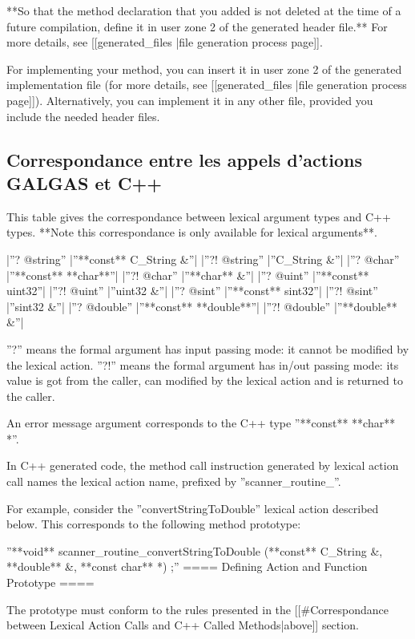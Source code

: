 {**So that the method declaration that you added is not deleted at the time of a future compilation, define it in user zone 2 of the generated header file.** For more details, see [[generated\_files |file generation process page]].

For implementing your method, you can insert it in user zone 2 of the generated implementation file (for more details, see [[generated\_files |file generation process page]]). Alternatively, you can implement it in any other file, provided you include the needed header files.

\subsection{Correspondance entre les appels d'actions GALGAS et C++}

This table gives the correspondance between lexical argument types and C++ types. **Note this correspondance is only available for lexical arguments**.

|''? @string''  |''**const** C\_String \&''|
|''?! @string''  |''C\_String \&''|
|''? @char''  |''**const** **char**''|
|''?! @char''  |''**char** \&''|
|''? @uint''  |''**const** uint32''|
|''?! @uint''  |''uint32 \&''|
|''? @sint''  |''**const** sint32''|
|''?! @sint''  |''sint32 \&''|
|''? @double''  |''**const** **double**''|
|''?! @double''  |''**double** \&''|

''?'' means the formal argument has input passing mode: it cannot be modified by the lexical action. ''?!'' means the formal argument has in/out passing mode: its value is got from the caller, can modified by the lexical action and is returned to the caller.

An error message argument corresponds to the C++ type ''**const** **char** *''.

In C++ generated code, the method call instruction generated by lexical action call names the lexical action name, prefixed by ''scanner\_routine\_''.

For example, consider the ''convertStringToDouble'' lexical action described below. This corresponds to the following method prototype:

''**void** scanner\_routine\_convertStringToDouble (**const** C\_String \&, **double** \&, **const char** *) ;''
==== Defining Action and Function Prototype ====

The prototype must conform to the rules presented in the [[\#Correspondance between Lexical Action Calls and C++ Called Methods|above]] section.

}
